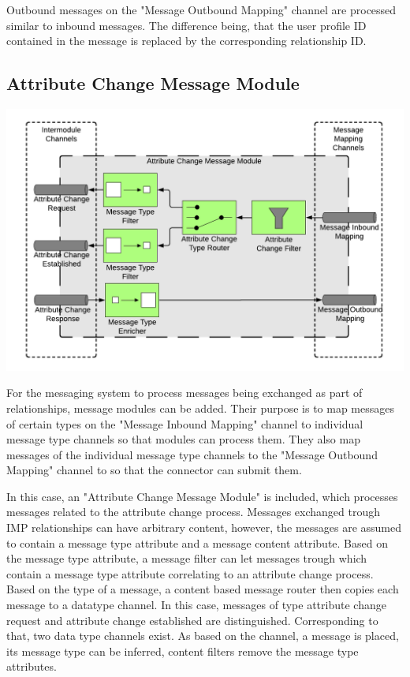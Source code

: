 Outbound messages on the "Message Outbound Mapping" channel are processed similar to inbound messages. The difference being, that the user profile ID contained in the message is replaced by the corresponding relationship ID.

\subsection{Attribute Change Message Module}

\begin{center}
    \includegraphics[scale=0.6]{Diagrams/Integration Architecture 1/Technological Integration/11. Attribute Change Message Module.pdf}
\end{center}

For the messaging system to process messages being exchanged as part of relationships, message modules can be added. Their purpose is to map messages of certain types on the "Message Inbound Mapping" channel to individual message type channels so that modules can process them. They also map messages of the individual message type channels to the "Message Outbound Mapping" channel to so that the connector can submit them.

In this case, an "Attribute Change Message Module" is included, which processes messages related to the attribute change process. Messages exchanged trough IMP relationships can have arbitrary content, however, the messages are assumed to contain a message type attribute and a message content attribute. Based on the message type attribute, a message filter can let messages trough which contain a message type attribute correlating to an attribute change process. Based on the type of a message, a content based message router then copies each message to a datatype channel. In this case, messages of type attribute change request and attribute change established are distinguished. Corresponding to that, two data type channels exist. As based on the channel, a message is placed, its message type can be inferred, content filters remove the message type attributes.

